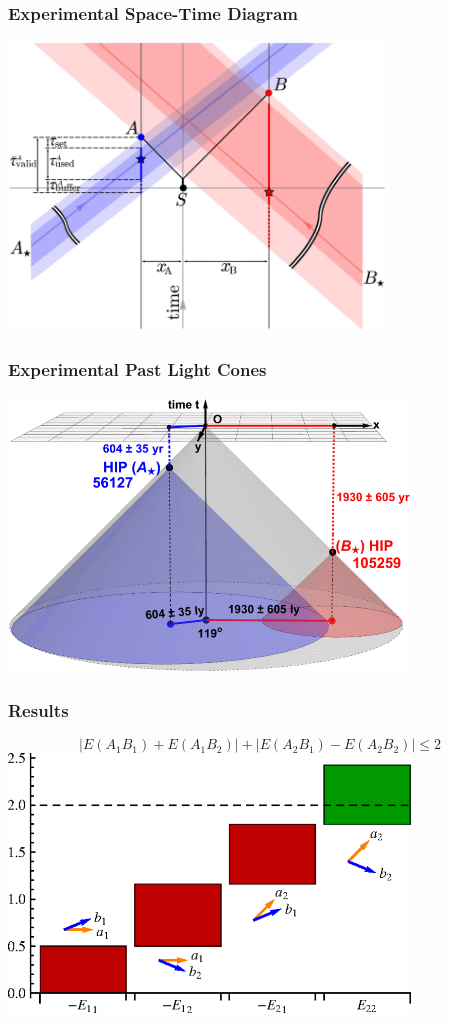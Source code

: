 \documentclass{beamer}
\begin{document}
\begin{frame}\frametitle{Experimental Space-Time Diagram}
    \centering
    \includegraphics[width=0.75\textwidth]{Images/Light_Lines.png}

    \cite{Handsteiner2016}
\end{frame}

\begin{frame}\frametitle{Experimental Past Light Cones}
    \centering
    \includegraphics[width=0.8\textwidth]{Images/Light_Cones.png}

    \cite{Handsteiner2016}
\end{frame}

\begin{frame}\frametitle{Results}
    $$\left|E(A_1B_1) + E(A_1B_2)\right| + \left|E(A_2B_1) - E(A_2B_2)\right| \le 2$$
    \centering
    \includegraphics[width=0.8\textwidth]{Images/Corr.png}

    \cite{Handsteiner2016}
\end{frame}
\end{document}
